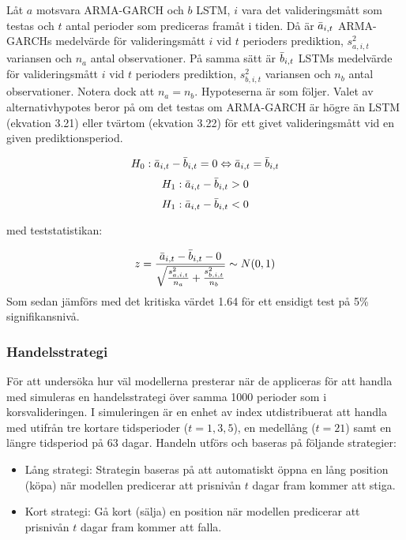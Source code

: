 \documentclass[11pt]{article}
\numberwithin{equation}{section}
\numberwithin{table}{section}
\numberwithin{figure}{section}
\begin{document}
Låt $a$ motsvara ARMA-GARCH och $b$ LSTM, $i$ vara det valideringsmått som testas och $t$ antal perioder som prediceras framåt i tiden. Då är $\Bar{a}_{i,t}$ ARMA-GARCHs medelvärde för valideringsmått $i$ vid $t$ perioders prediktion, $s_{a,i,t}^2$ variansen och $n_a$ antal observationer. På samma sätt är  $\Bar{b}_{i,t}$ LSTMs medelvärde för valideringsmått $i$ vid $t$ perioders prediktion, $s_{b,i,t}^2$ variansen och $n_b$ antal observationer. Notera dock att $n_a = n_b$. Hypoteserna är som följer. Valet av alternativhypotes beror på om det testas om ARMA-GARCH är högre än LSTM (ekvation 3.21) eller tvärtom (ekvation 3.22) för ett givet valideringsmått vid en given prediktionsperiod. 

\begin{equation}
    H_0: \Bar{a}_{i,t} - \Bar{b}_{i,t} = 0 \Leftrightarrow \Bar{a}_{i,t} = \Bar{b}_{i,t}
\end{equation}
\begin{equation}
    H_1: \Bar{a}_{i,t} - \Bar{b}_{i,t} > 0
\end{equation}
\begin{equation}
    H_1: \Bar{a}_{i,t} - \Bar{b}_{i,t} < 0
\end{equation}

med teststatistikan: 

\begin{equation}
    z = \frac{\Bar{a}_{i,t} - \Bar{b}_{i,t} - 0}{\sqrt{\frac{s_{a,i,t}^2}{n_a}+\frac{s_{b,i,t}^2}{n_b}}} \sim N(0,1)
\end{equation}
Som sedan jämförs med det kritiska värdet 1.64 för ett ensidigt test på 5\% signifikansnivå.


\subsubsection{Handelsstrategi}
För att undersöka hur väl modellerna presterar när de appliceras för att handla med simuleras en handelsstrategi över samma 1000 perioder som i korsvalideringen. I simuleringen är en enhet av index utdistribuerat att handla med utifrån tre kortare tidsperioder ($t=1,3,5$), en medellång ($t=21$) samt en längre tidsperiod på 63 dagar. Handeln utförs och baseras på följande strategier:

\begin{itemize}
    \item Lång strategi: Strategin baseras på att automatiskt öppna en lång position (köpa) när modellen predicerar att prisnivån $t$ dagar fram kommer att stiga.
    \item Kort strategi: Gå kort (sälja) en position när modellen predicerar att prisnivån $t$ dagar fram kommer att falla. 
\end{itemize}
\end{document}

